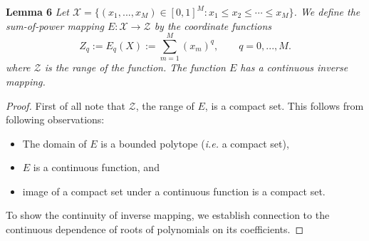 \documentclass{article}
\newcommand{\latinphrase}[1]{\emph{#1}}    %
\newcommand{\ie}{\latinphrase{i.e.}\xspace}
\begin{document}
\textbf{Lemma 6} {\em 
Let $\mathcal{X}=\{ (x_1,...,x_M) \in [0,1]^M : x_1 \leq x_2 \leq \cdots \leq x_M \}$. We define the sum-of-power mapping $E: \mathcal{X} \to \mathcal{Z}$  by the coordinate functions
\begin{equation}
Z_q := E_q(X) := \sum_{m=1}^M (x_m)^q, \qquad q = 0, ..., M.
\end{equation}
where $\mathcal{Z}$ is the range of the function. The function $E$ has a continuous inverse mapping.
}
\begin{proof}
First of all note that $\mathcal{Z}$, the range of $E$, is a compact set. This follows from following observations:
\begin{itemize}
\item The domain of $E$ is a bounded polytope (\ie a compact set),
\item $E$ is a continuous function, and 
\item image of a compact set under a continuous function is a compact set.
\end{itemize}

To show the continuity of inverse mapping, we establish connection to the continuous dependence of roots of polynomials on its coefficients.


\end{proof}
\end{document}
